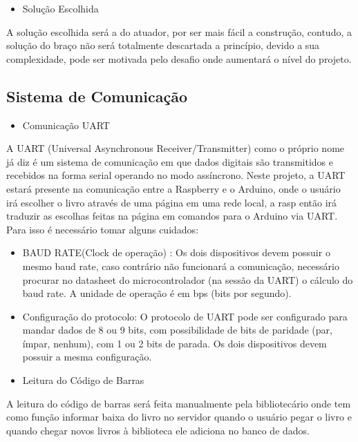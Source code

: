 \begin{itemize}
\item{Solução Escolhida}
\end{itemize}

A solução escolhida será a do atuador, por ser mais fácil a construção, contudo, a solução do braço  não será totalmente descartada a princípio, devido a sua complexidade, pode ser motivada pelo desafio onde aumentará o nível do projeto.

\subsection{Sistema de Comunicação}

\begin{itemize}
\item{Comunicação UART}
\end{itemize}

A UART (Universal Asynchronous Receiver/Transmitter) como o próprio nome já diz é um sistema de comunicação em que dados digitais são transmitidos e recebidos na forma serial operando no modo assíncrono. Neste projeto, a UART estará presente na comunicação entre a Raspberry e o Arduino, onde o usuário irá escolher o livro através de uma página em uma rede local, a rasp então irá traduzir as escolhas feitas na página em comandos para o Arduino via UART. Para isso é necessário tomar alguns cuidados:

\begin{itemize}
\item BAUD RATE(Clock de operação) : Os dois dispositivos devem possuir o mesmo baud rate, caso contrário não funcionará a comunicação, necessário procurar no datasheet do microcontrolador (na sessão da UART) o cálculo do baud rate. A unidade de operação é em bps (bits por segundo).
\item Configuração do protocolo: O protocolo de UART pode ser configurado para mandar dados de 8 ou 9 bits, com possibilidade de bits de paridade (par, ímpar, nenhum), com 1 ou 2 bits de parada. Os dois dispositivos devem possuir a mesma configuração.
\end{itemize}

\begin{itemize}
\item{Leitura do Código de Barras}
\end{itemize}

A leitura do código de barras será feita manualmente pela bibliotecário onde tem como função informar baixa do livro no servidor quando o usuário pegar o livro e quando chegar novos livros à biblioteca ele adiciona no banco de dados. 

